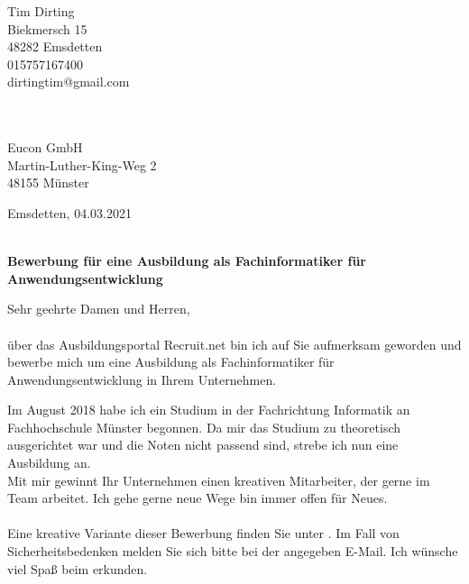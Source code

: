 \documentclass[12pt,twoside,a4paper]{scrlttr2}
\begin{document}
	
	\begin{letter}
		
			\begin{flushright}
				Tim Dirting \\
				Biekmersch 15\\ 
				48282 Emsdetten \\
				015757167400 \\
				dirtingtim@gmail.com\\  
				  \, \\
				  \, \\
			\end{flushright}
		
			\begin{flushleft}
				Eucon GmbH \\
				Martin-Luther-King-Weg 2 \\
				48155 Münster\\
			
			
	
			\end{flushleft}
	
			\begin{flushright}
			Emsdetten, 04.03.2021\\
			\end{flushright}

			\textbf{ \\ Bewerbung f\"ur eine Ausbildung als Fachinformatiker f\"ur Anwendungsentwicklung}

			\begin{flushleft}
			Sehr geehrte Damen und Herren,\\
			 \, \\		
			 
			über das Ausbildungsportal Recruit.net bin ich auf Sie aufmerksam geworden und bewerbe mich um eine Ausbildung als Fachinformatiker für Anwendungsentwicklung in Ihrem Unternehmen.
			
		   
			Im August 2018 habe ich ein Studium in der Fachrichtung Informatik an Fachhochschule Münster begonnen. Da mir das Studium zu theoretisch ausgerichtet war und die Noten nicht passend sind, strebe ich nun eine Ausbildung an.		\\	
			Mit mir gewinnt Ihr Unternehmen einen kreativen Mitarbeiter, der gerne im Team arbeitet. Ich gehe gerne neue Wege bin immer offen für Neues.\\
			\,\\
			Eine kreative Variante dieser Bewerbung finden Sie unter  . Im Fall von Sicherheitsbedenken melden Sie sich bitte bei der angegeben E-Mail. Ich w\"unsche viel Spaß beim erkunden.
		

\end{flushleft}
\end{letter}
\end{document}
